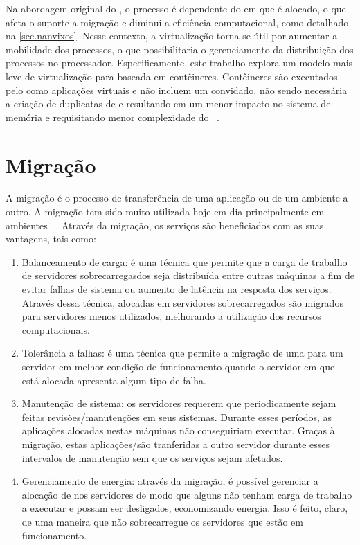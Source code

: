 Na abordagem original do \nanvix, o processo é dependente do \cluster em que é alocado, o que afeta o suporte a migração e diminui a eficiência computacional, como detalhado na \autoref{sec.nanvixos}. Nesse contexto, a virtualização torna-se útil por aumentar a mobilidade dos processos, o que possibilitaria o gerenciamento da distribuição dos processos no processador. Especificamente, este trabalho explora um modelo mais leve de virtualização para \lws baseada em contêineres. Contêineres são executados pelo \os como aplicações virtuais e não incluem um \os convidado, não sendo necessária a criação de duplicatas de \sos e resultando em um menor impacto no sistema de memória e requisitando menor complexidade do \hardware~\cite{thalheim2018cntr, sharma2016containers, zhang2018comparative}.


\section{Migração}
A migração é o processo de transferência de uma aplicação ou \vm de um ambiente a outro. A migração tem sido muito utilizada hoje em dia principalmente em ambientes \cloud~\cite{imran2022live}. Através da migração, os serviços são beneficiados com as suas vantagens, tais como:
\begin{enumerate}[label=(\roman*)]
    \item Balanceamento de carga: é uma técnica que permite que a carga de trabalho de servidores sobrecarregasdos seja distribuída entre outras máquinas a fim de evitar falhas de sistema ou aumento de latência na resposta dos serviços. Através dessa técnica, \vms alocadas em servidores sobrecarregados são migrados para servidores menos utilizados, melhorando a utilização dos recursos computacionais.
    \item Tolerância a falhas: é uma técnica que permite a migração de uma \vm para um servidor em melhor condição de funcionamento quando o servidor em que está alocada apresenta algum tipo de falha.
    \item Manutenção de sistema: os servidores requerem que periodicamente sejam feitas revisões/manutenções em seus sistemas. Durante esses períodos, as aplicações alocadas nestas máquinas não conseguiriam executar. Graças à migração, estas aplicações/\vms são tranferidas a outro servidor durante esses intervalos de manutenção sem que os serviços sejam afetados.
    \item Gerenciamento de energia: através da migração, é possível gerenciar a alocação de \vms nos servidores de modo que alguns não tenham carga de trabalho a executar e possam ser desligados, economizando energia. Isso é feito, claro, de uma maneira que não sobrecarregue os servidores que estão em funcionamento.
\end{enumerate}

